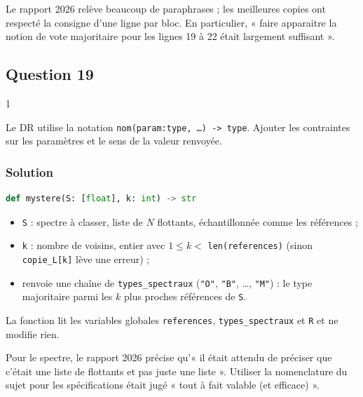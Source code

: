 \documentclass[11pt,a4paper]{article}
\providecommand{\tightlist}{\setlength{\itemsep}{0pt}\setlength{\parskip}{0pt}}
\begin{document}
\begin{jury}

Le rapport 2026 relève beaucoup de paraphrases ; les meilleures copies ont respecté la consigne d'une ligne par bloc. En particulier, « faire apparaitre la notion de vote majoritaire pour les lignes 19 à 22 était largement suffisant ».

\end{jury}

\hypertarget{question-19}{%
\subsection{Question 19}\label{question-19}}

\begin{indication}{1}

Le DR utilise la notation \texttt{nom(\allowbreak{}param:\allowbreak{}type,\allowbreak{}\ …)\allowbreak{}\ -\textgreater{}\ type}. Ajouter les contraintes sur les paramètres et le sens de la valeur renvoyée.

\end{indication}

\hypertarget{solution-18}{%
\subsubsection{Solution}\label{solution-18}}

\begin{lstlisting}[language=Python]
def mystere(S: [float], k: int) -> str
\end{lstlisting}

\begin{itemize}
\tightlist
\item
  \texttt{S} : spectre à classer, liste de \(N\) flottants, échantillonnée comme les références ;
\item
  \texttt{k} : nombre de voisins, entier avec \(1 \leqslant k <\) \texttt{len(references)} (sinon \texttt{copie\_L{[}k{]}} lève une erreur) ;
\item
  renvoie une chaîne de \texttt{types\_spectraux} (\texttt{"O"}, \texttt{"B"}, \ldots, \texttt{"M"}) : le type majoritaire parmi les \(k\) plus proches références de \texttt{S}.
\end{itemize}

La fonction lit les variables globales \texttt{references}, \texttt{types\_spectraux} et \texttt{R} et ne modifie rien.

\begin{jury}

Pour le spectre, le rapport 2026 précise qu'« il était attendu de préciser que c'était une liste de flottants et pas juste une liste ». Utiliser la nomenclature du sujet pour les spécifications était jugé « tout à fait valable (et efficace) ».

\end{jury}
\end{document}
